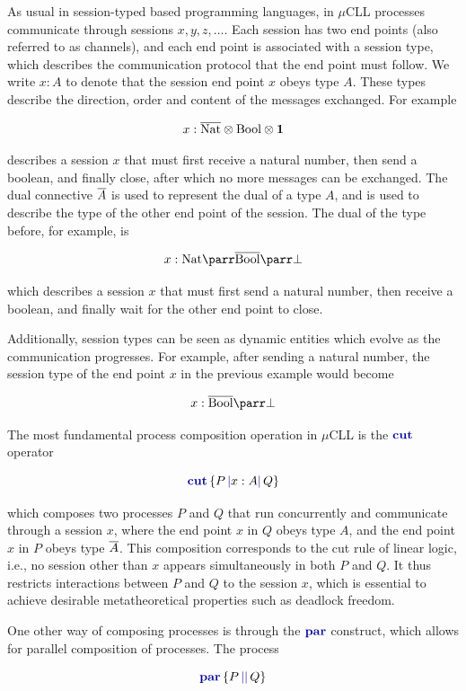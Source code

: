 As usual in session-typed based programming languages, in $\mu$CLL processes communicate through sessions $x, y, z, \ldots$. Each session has two end points (also referred to as channels), and each end point is associated with a session type, which describes the communication protocol that the end point must follow. We write $x: A$ to denote that the session end point $x$ obeys type $A$. These types describe the direction, order and content of the messages exchanged. For example

$$
    x : \overline{\text{Nat}} \otimes \text{Bool} \otimes \mathbf{1}
$$

describes a session $x$ that must first receive a natural number, then send a boolean, and finally close, after which no more messages can be exchanged. The dual connective $\overline{A}$ is used to represent the dual of a type $A$, and is used to describe the type of the other end point of the session. The dual of the type before, for example, is

$$
    x : \text{Nat} \parr \dual{\text{Bool}} \parr \bot
$$

which describes a session $x$ that must first send a natural number, then receive a boolean, and finally wait for the other end point to close.

Additionally, session types can be seen as dynamic entities which evolve as the communication progresses. For example, after sending a natural number, the session type of the end point $x$ in the previous example would become

$$
    x : \dual{\text{Bool}} \parr \bot
$$

The most fundamental process composition operation in $\mu$CLL is the $\cutp$ operator

$$
    \cutc{P}{x: A}{Q}
$$

which composes two processes $P$ and $Q$ that run concurrently and communicate through a session $x$, where the end point $x$ in $Q$ obeys type $A$, and the end point $x$ in $P$ obeys type $\overline{A}$. This composition corresponds to the cut rule of linear logic, i.e., no session other than $x$ appears simultaneously in both $P$ and $Q$. It thus restricts interactions between $P$ and $Q$ to the session $x$, which is essential to achieve desirable metatheoretical properties such as deadlock freedom.

One other way of composing processes is through the $\parp$ construct, which allows for parallel composition of processes. The process

$$
    \parc{P}{Q}
$$

